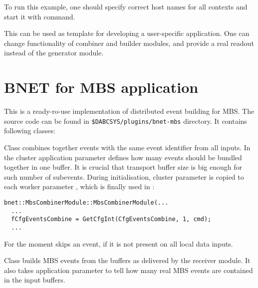 To run this example, one should specify correct host names for all contexts and 
start it with  command.      

This can be used as template for developing a user-specific application.
One can change functionality of combiner and builder modules, and provide a 
real readout instead of the generator module. 


\section{BNET for MBS application}
\label{prog_exabnet_mbs}
This is a ready-ro-use implementation of distributed event building for MBS.
The source code can be found in {\tt \$DABCSYS/plugins/bnet-mbs} directory.
It contains following classes:
\bbul
\item  {}
\item  {}
\item  {}
\item  {}
\ebul

Class  combines together  
events with the same event identifier from all inputs. 
In the cluster application parameter  defines how many
events should be bundled together in one buffer. It is crucial that transport
buffer size is big enough for such number of subevents. During initialisation,
cluster parameter   is copied to each
worker parameter , which is finally used in : 
   
\begin{small}
\begin{verbatim}
bnet::MbsCombinerModule::MbsCombinerModule(...  
  ...
  fCfgEventsCombine = GetCfgInt(CfgEventsCombine, 1, cmd);
  ...
\end{verbatim}
\end{small}

For the moment  skips an event, 
if it is not present on all local data inputs. 

Class  builds MBS events from
the buffers as delivered by the receiver module. It also takes 
application parameter  to tell how many real MBS events
are contained in the input buffers.
  
